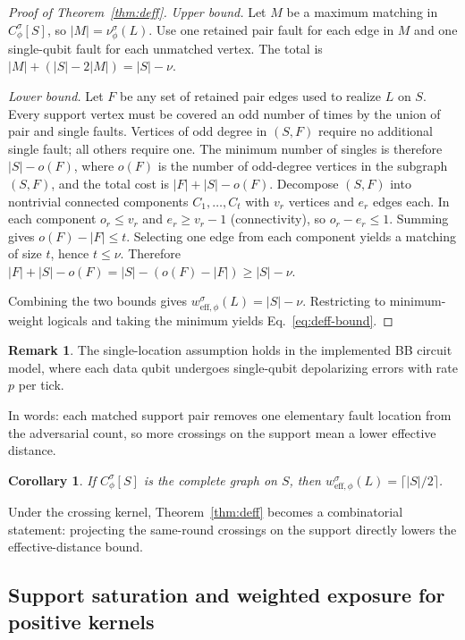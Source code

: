 \documentclass[
aps,
prx,
10pt,
twocolumn,
groupedaddress,
longbibliography,
nofootinbib,
floatfix
]{revtex4-2}
\newtheorem{corollary}{Corollary}
\theoremstyle{definition}
\newtheorem{remark}{Remark}
\begin{document}
\begin{proof}[Proof of Theorem~\ref{thm:deff}]
\emph{Upper bound.} Let $M$ be a maximum matching in $C_{\phi}^{\sigma}[S]$, so $|M|=\nu_{\phi}^{\sigma}(L)$. Use one retained pair fault for each edge in $M$ and one single-qubit fault for each unmatched vertex. The total is $|M|+(|S|-2|M|)=|S|-\nu$.

\emph{Lower bound.} Let $F$ be any set of retained pair edges used to realize $L$ on $S$. Every support vertex must be covered an odd number of times by the union of pair and single faults. Vertices of odd degree in $(S,F)$ require no additional single fault; all others require one. The minimum number of singles is therefore $|S|-o(F)$, where $o(F)$ is the number of odd-degree vertices in the subgraph $(S,F)$, and the total cost is $|F|+|S|-o(F)$. Decompose $(S,F)$ into nontrivial connected components $C_1,\ldots,C_t$ with $v_r$ vertices and $e_r$ edges each. In each component $o_r\le v_r$ and $e_r\ge v_r-1$ (connectivity), so $o_r-e_r\le 1$. Summing gives $o(F)-|F|\le t$. Selecting one edge from each component yields a matching of size $t$, hence $t\le\nu$. Therefore $|F|+|S|-o(F)=|S|-(o(F)-|F|)\ge|S|-\nu$.

Combining the two bounds gives $w^{\sigma}_{\mathrm{eff},\phi}(L)=|S|-\nu$. Restricting to minimum-weight logicals and taking the minimum yields Eq.~\eqref{eq:deff-bound}.

\end{proof}

\begin{remark}
The single-location assumption holds in the implemented BB circuit model, where each data qubit undergoes single-qubit depolarizing errors with rate $p$ per tick.
\end{remark}

In words: each matched support pair removes one elementary fault location from the adversarial count, so more crossings on the support mean a lower effective distance.

\begin{corollary}
\label{cor:complete-weff}
If $C_{\phi}^{\sigma}[S]$ is the complete graph on $S$, then $w^{\sigma}_{\mathrm{eff},\phi}(L)=\lceil|S|/2\rceil$.
\end{corollary}

Under the crossing kernel, Theorem~\ref{thm:deff} becomes a combinatorial statement: projecting the same-round crossings on the support directly lowers the effective-distance bound.

\subsection{Support saturation and weighted exposure for positive kernels}
\end{document}
